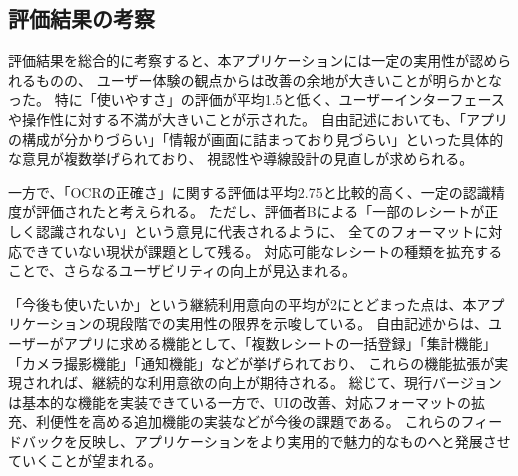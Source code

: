 \documentclass[main]{subfiles}
\begin{document}
\subsection{評価結果の考察}

評価結果を総合的に考察すると、本アプリケーションには一定の実用性が認められるものの、
ユーザー体験の観点からは改善の余地が大きいことが明らかとなった。
特に「使いやすさ」の評価が平均1.5と低く、ユーザーインターフェースや操作性に対する不満が大きいことが示された。
自由記述においても、「アプリの構成が分かりづらい」「情報が画面に詰まっており見づらい」といった具体的な意見が複数挙げられており、
視認性や導線設計の見直しが求められる。

一方で、「OCRの正確さ」に関する評価は平均2.75と比較的高く、一定の認識精度が評価されたと考えられる。
ただし、評価者Bによる「一部のレシートが正しく認識されない」という意見に代表されるように、
全てのフォーマットに対応できていない現状が課題として残る。
対応可能なレシートの種類を拡充することで、さらなるユーザビリティの向上が見込まれる。

「今後も使いたいか」という継続利用意向の平均が2にとどまった点は、本アプリケーションの現段階での実用性の限界を示唆している。
自由記述からは、ユーザーがアプリに求める機能として、「複数レシートの一括登録」「集計機能」「カメラ撮影機能」「通知機能」などが挙げられており、
これらの機能拡張が実現されれば、継続的な利用意欲の向上が期待される。
総じて、現行バージョンは基本的な機能を実装できている一方で、UIの改善、対応フォーマットの拡充、利便性を高める追加機能の実装などが今後の課題である。
これらのフィードバックを反映し、アプリケーションをより実用的で魅力的なものへと発展させていくことが望まれる。
\end{document}
